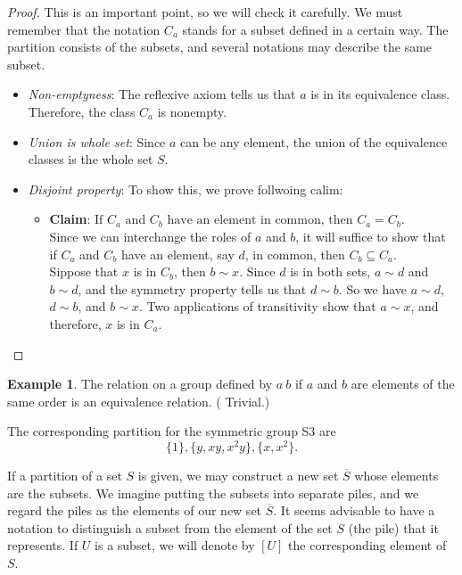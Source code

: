 \documentclass[
]{book}
\providecommand{\tightlist}{%
  \setlength{\itemsep}{0pt}\setlength{\parskip}{0pt}}
\theoremstyle{definition}
\theoremstyle{definition}
\newtheorem{example}{Example}[chapter]
\theoremstyle{definition}
\theoremstyle{definition}
\theoremstyle{remark}
\begin{document}
\begin{proof}

This is an important point, so we will check it carefully. We must remember that the notation \(C_a\) stands for a subset defined in a certain way. The partition consists of the subsets, and several notations may describe the same subset.

\begin{itemize}
\item
  \emph{Non-emptyness}: The reflexive axiom tells us that \(a\) is in its equivalence class. Therefore, the class \(C_a\) is nonempty.
\item
  \emph{Union is whole set}: Since \(a\) can be any element, the union of the equivalence classes is the whole set \(S\).
\item
  \emph{Disjoint property}: To show this, we prove follwoing calim:

  \begin{itemize}
  \tightlist
  \item
    \textbf{Claim}: \(\text{If } C_a \text{ and } C_b \text{ have an element in common, then } C_a = C_b\).\\
    Since we can interchange the roles of \(a\) and \(b\), it will suffice to show that if \(C_a\) and \(C_b\) have an element, say \(d\), in common, then \(C_b \subseteq C_a\).\\
    Sippose that \(x\) is in \(C_b\), then \(b \sim x\). Since \(d\) is in both sets, \(a \sim d\) and \(b \sim d\), and the symmetry property tells us that \(d \sim b\). So we have \(a \sim d\), \(d \sim b\), and \(b \sim x\). Two applications of transitivity show that \(a \sim x\), and therefore, \(x\) is in \(C_a\).
  \end{itemize}
\end{itemize}

\end{proof}

\begin{example}
\protect\hypertarget{exm:272}{}\label{exm:272}The relation on a group defined by \(a ~ b\) if \(a\) and \(b\) are elements of the same order is an equivalence relation. ( Trivial.)

The corresponding partition for the symmetric group S3 are
\[\{1\}, \{y, xy, x^2y\}, \{x, x^2\}.\]
\end{example}

If a partition of a set \(S\) is given, we may construct a new set \(\overline{S}\) whose elements are the subsets. We imagine putting the subsets into separate piles, and we regard the piles as the elements of our new set \(\overline{S}\). It seems advisable to have a notation to distinguish a subset from the element of the set \(S\) (the pile) that it represents. If \(U\) is a subset, we will denote by \([U]\) the corresponding element of \(S\).
\end{document}

